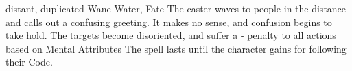   {distant, duplicated}%
  {Wane}%
  {Water, Fate}%
  {}%
  {
    The caster waves to people in the distance and calls out a confusing greeting.
    It makes no sense, and confusion begins to take hold.
    The targets become disoriented, and suffer a - penalty to all actions based on Mental Attributes}%
  {
    The spell lasts until the character gains  for following their Code.
  }
